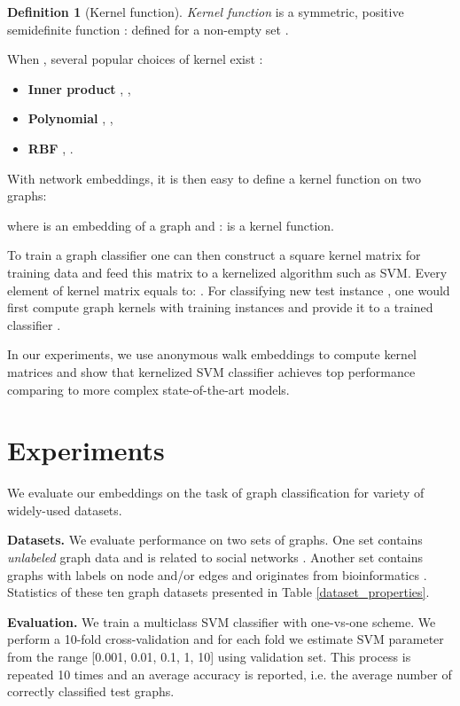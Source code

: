 \documentclass{article}
\theoremstyle{definition}
\newtheorem{definition}{Definition}
\begin{document}
\begin{definition}[Kernel function]
\textit{Kernel function} is a symmetric, positive semidefinite function :  defined for a non-empty set . 
\end{definition}
When , several popular choices of kernel exist \cite{smola:01}:
\begin{itemize}
\item \textbf{Inner product} , ,
\item \textbf{Polynomial} , ,
\item \textbf{RBF} , .
\end{itemize}

With network embeddings, it is then easy to define a kernel function on two graphs: 

where  is an embedding of a graph  and :  is a kernel function.

To train a graph classifier  one can then construct a square kernel matrix  for training data  and feed this matrix to a kernelized algorithm such as SVM. Every element of kernel matrix equals to: .
For classifying new test instance , one would first compute graph kernels with training instances  and provide it to a trained classifier .

In our experiments, we use anonymous walk embeddings to compute kernel matrices and show that kernelized SVM classifier achieves top performance comparing to more complex state-of-the-art models. 
\section{Experiments}
We evaluate our embeddings on the task of graph classification for variety of widely-used datasets.

\textbf{Datasets.} We evaluate performance on two sets of graphs. One set contains \textit{unlabeled } graph data and is related to social networks \cite{deepgraph}. Another set contains graphs with labels on node and/or edges and originates from bioinformatics \cite{wlkernel:11}. Statistics of these ten graph datasets presented in Table \ref{dataset_properties}. 

\textbf{Evaluation.}
We train a multiclass SVM classifier with one-vs-one scheme. We perform a 10-fold cross-validation and for each fold we estimate SVM parameter  from the range [0.001, 0.01, 0.1, 1, 10] using validation set. This process is repeated 10 times and an average accuracy is reported, i.e. the average number of correctly classified test graphs.
\end{document}
